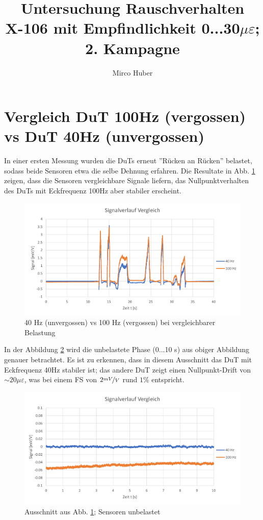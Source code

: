 \documentclass[12pt,a4paper]{article}
\title{Untersuchung Rauschverhalten\\[3ex] \small{ X-106 mit Empfindlichkeit 0...30$\mu\varepsilon$; 2. Kampagne}}
\author{Mirco Huber}
\begin{document}
	\maketitle
	\newpage

\section{Vergleich DuT 100Hz (vergossen) vs DuT 40Hz (unvergossen)}
\noindent
In einer ersten Messung wurden die DuTs erneut ''Rücken an Rücken'' belastet, sodass beide Sensoren etwa die selbe Dehnung erfahren. Die Resultate in Abb. \ref{fig:daten001} zeigen, dass die Sensoren vergleichbare Signale liefern, das Nullpunktverhalten des DuTs mit Eckfrequenz 100Hz aber stabiler erscheint.
\begin{figure}[H]
	\centering
	\includegraphics[width=1\linewidth]{imgs/daten_001}
	\caption{40 Hz (unvergossen) vs 100 Hz (vergossen) bei vergleichbarer Belastung}
	\label{fig:daten001}
\end{figure}
\noindent
In der Abbildung \ref{fig:daten001_NP} wird die unbelastete Phase (0...10 s) aus obiger Abbildung genauer betrachtet. Es ist zu erkennen, dass in diesem Ausschnitt das DuT mit Eckfrequenz 40Hz stabiler ist; das andere DuT zeigt einen Nullpunkt-Drift von $\sim 20\mu\varepsilon$, was bei einem FS von $2\nicefrac{mV}{V}$ rund $ 1\%$ entspricht. 
\begin{figure}[H]
	\centering
	\includegraphics[width=1\linewidth]{imgs/daten_001_NP}
	\caption{Ausschnitt aus Abb. \ref{fig:daten001}; Sensoren unbelastet}
	\label{fig:daten001_NP}
\end{figure}\noindent
\end{document}

